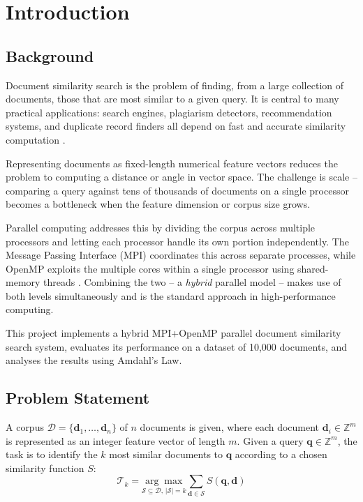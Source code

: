 \documentclass[12pt,a4paper]{article}
\begin{document}


\renewcommand*\contentsname{Table of Contents}
\tableofcontents
\newpage
\listoffigures
\newpage
\listoftables
\newpage
{}

\clearpage
\section{Introduction}

\subsection{Background}

Document similarity search is the problem of finding, from a large
collection of documents, those that are most similar to a given query.
It is central to many practical applications: search engines, plagiarism
detectors, recommendation systems, and duplicate record finders all
depend on fast and accurate similarity computation \cite{manning2008}.

Representing documents as fixed-length numerical feature vectors reduces
the problem to computing a distance or angle in vector space. The
challenge is scale -- comparing a query against tens of thousands of
documents on a single processor becomes a bottleneck when the feature
dimension or corpus size grows.

Parallel computing addresses this by dividing the corpus across multiple
processors and letting each processor handle its own portion
independently. The Message Passing Interface (MPI) coordinates this
across separate processes, while OpenMP exploits the multiple cores
within a single processor using shared-memory threads \cite{gropp1999mpi}.
Combining the two -- a \textit{hybrid} parallel model -- makes use of
both levels simultaneously and is the standard approach in
high-performance computing.

This project implements a hybrid MPI+OpenMP parallel document similarity
search system, evaluates its performance on a dataset of 10,000
documents, and analyses the results using Amdahl's Law.

\subsection{Problem Statement}

A corpus $\mathcal{D} = \{\mathbf{d}_1, \ldots, \mathbf{d}_n\}$ of $n$
documents is given, where each document $\mathbf{d}_i \in \mathbb{Z}^m$
is represented as an integer feature vector of length $m$. Given a query
$\mathbf{q} \in \mathbb{Z}^m$, the task is to identify the $k$ most
similar documents to $\mathbf{q}$ according to a chosen similarity
function $S$:
\begin{equation}
    \mathcal{T}_k = \underset{\mathcal{S} \subseteq \mathcal{D},\,
    |\mathcal{S}|=k}{\arg\max}
    \sum_{\mathbf{d} \in \mathcal{S}} S(\mathbf{q}, \mathbf{d})
\end{equation}
\end{document}
